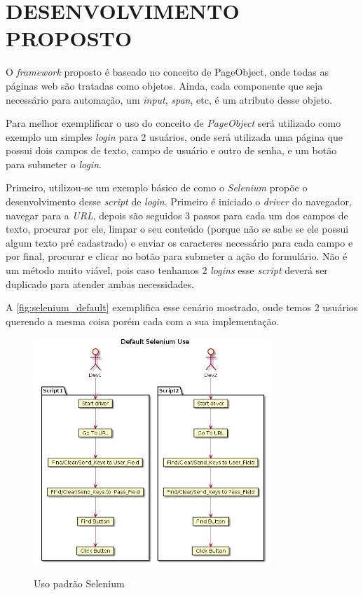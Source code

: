 %
%

\chapter{DESENVOLVIMENTO PROPOSTO}\label{chap:proj}
    O \textit{framework} proposto é baseado no conceito de PageObject, onde todas as páginas web são tratadas como objetos.
    Ainda, cada componente que seja necessário para automação, um \textit{input}, \textit{span}, etc, é um atributo desse objeto.

    Para melhor exemplificar o uso do conceito de \textit{PageObject} será utilizado como exemplo um simples \textit{login} para 2
    usuários, onde será utilizada uma página que possui dois campos de texto, campo de usuário e outro de senha,
    e um botão para submeter o \textit{login}.

    Primeiro, utilizou-se um exemplo básico de como o \textit{Selenium} propõe o desenvolvimento desse \textit{script} de \textit{login}.
    Primeiro é iniciado o \textit{driver} do navegador, navegar para a \textit{URL}, depois
    são seguidos 3 passos para cada um dos campos de texto, procurar por ele, limpar o seu conteúdo
    (porque não se sabe se ele possui algum texto pré cadastrado) e enviar os caracteres necessário para
    cada campo e por final, procurar e clicar no botão para submeter a ação do formulário. Não é um método muito viável,
    pois caso tenhamos 2 \textit{logins} esse \textit{script} deverá ser duplicado para atender ambas necessidades.

    A \autoref{fig:selenium_default} exemplifica esse cenário mostrado, onde temos 2 usuários querendo a mesma coisa porém
    cada com a sua implementação.


    \begin{figure}[h]
        \vspace*{0,3cm}
        \centering
        \caption{Uso padrão Selenium}
        \includegraphics[width=0.8\textwidth]{./04-figuras/page_object_selenium}
        \label{fig:selenium_default}
    \end{figure}


